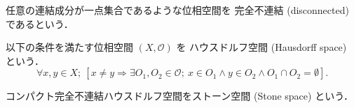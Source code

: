 \documentclass[titlepage]{ltjsreport}
\newtheorem[S]{theorem}{定理}[chapter]
\newtheorem[S]{definition}[theorem]{定義}
\newtheorem[S]{example}[theorem]{例}
\begin{document}
\begin{definition}[完全不連結]
  任意の連結成分が一点集合であるような位相空間を
  完全不連結 (disconnected) であるという．
\end{definition}

\begin{definition}[ハウスドルフ空間]
  以下の条件を満たす位相空間 $(X,\mathcal{O})$ を
  ハウスドルフ空間 (Hausdorff space) という．
  \begin{equation}
    \forall x,y\in X;
    \ \left[x\neq y\Longrightarrow\exists O_1,O_2\in\mathcal{O};
      \ x\in O_1\wedge y\in O_2\wedge O_1\cap O_2=\emptyset\right].
  \end{equation}
\end{definition}

\begin{definition}[ストーン空間]\label{def:stone-space}
  コンパクト完全不連結ハウスドルフ空間をストーン空間 (Stone space) という．
\end{definition}
\end{document}
